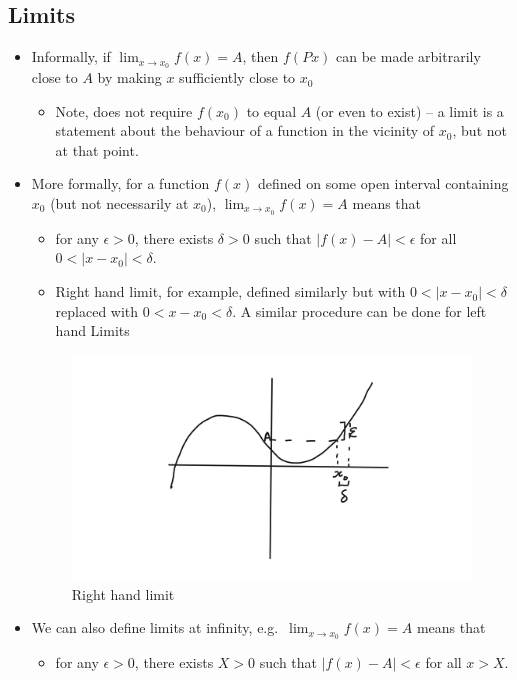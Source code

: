 \hypertarget{limits}{%
\subsection{Limits}\label{limits}}

\begin{itemize}
\item
  Informally, if \(\lim_{x \to x_0} f(x) = A\), then \(f(Px)\) can be made arbitrarily close to \(A\) by making \(x\) sufficiently close to \(x_0\)

  \begin{itemize}
  \tightlist
  \item
    Note, does not require \(f(x_0)\) to equal \(A\) (or even to exist) -- a limit is a statement about the behaviour of a function in the vicinity of \(x_0\), but not at that point.
  \end{itemize}
\item
  More formally, for a function \(f(x)\) defined on some open interval containing \(x_0\) (but not necessarily at \(x_0\)), \(\lim_{x \to x_0} f(x) = A\) means that

  \begin{itemize}
  \tightlist
  \item
    for any \(\epsilon > 0\), there exists \(\delta >0\) such that \(|f(x) - A| < \epsilon\) for all \(0 < |x - x_0| < \delta\).
  \item
    Right hand limit, for example, defined similarly but with \(0 < |x - x_0| < \delta\) replaced with \(0 < x - x_0 < \delta\). A similar procedure can be done for left hand Limits
  \end{itemize}

  \begin{figure}[h!]
    \centering 
    \includegraphics{figures/1}
    \caption{Right hand limit}
  \end{figure} \label{fig:1}
  
\item
  We can also define limits at infinity, e.g.~\(\lim_{x \to x_0} f(x) = A\) means that

  \begin{itemize}
  \tightlist
  \item
    for any \(\epsilon > 0\), there exists \(X >0\) such that \(|f(x) - A| < \epsilon\) for all \(x > X\).
  \end{itemize}
\end{itemize}

